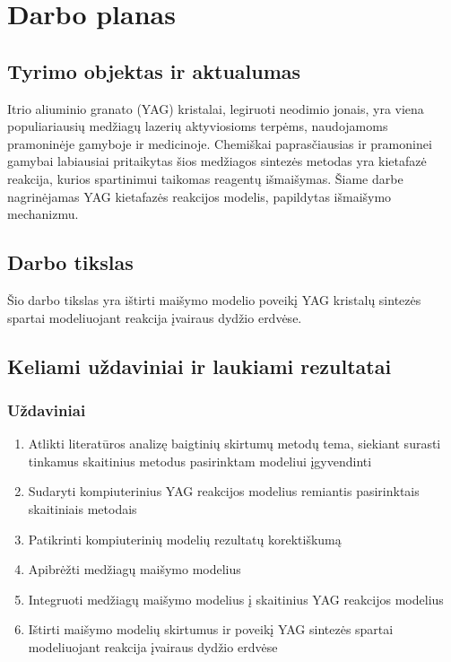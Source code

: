 \documentclass[]{VUMIFTemplateClass}
\begin{document}

\onehalfspacing


\section{Darbo planas}

\subsection{Tyrimo objektas ir aktualumas}

Itrio aliuminio granato (YAG) kristalai, legiruoti neodimio jonais, yra viena populiariausių medžiagų lazerių aktyviosioms terpėms, naudojamoms pramoninėje gamyboje ir medicinoje. Chemiškai paprasčiausias ir pramoninei gamybai labiausiai pritaikytas šios medžiagos sintezės metodas yra kietafazė reakcija, kurios spartinimui taikomas reagentų išmaišymas. Šiame darbe nagrinėjamas YAG kietafazės reakcijos modelis, papildytas išmaišymo mechanizmu.

\subsection{Darbo tikslas}

Šio darbo tikslas yra ištirti maišymo modelio poveikį YAG kristalų sintezės spartai modeliuojant reakcija įvairaus dydžio erdvėse.

\subsection{Keliami uždaviniai ir laukiami rezultatai}
\subsubsection{Uždaviniai}
\begin{enumerate}
    \item Atlikti literatūros analizę baigtinių skirtumų metodų tema, siekiant surasti tinkamus skaitinius metodus pasirinktam modeliui įgyvendinti
    \item Sudaryti kompiuterinius YAG reakcijos modelius remiantis pasirinktais skaitiniais metodais
    \item Patikrinti kompiuterinių modelių rezultatų korektiškumą
    \item Apibrėžti medžiagų maišymo modelius
    \item Integruoti medžiagų maišymo modelius į skaitinius YAG reakcijos modelius
    \item Ištirti maišymo modelių skirtumus ir poveikį YAG sintezės spartai modeliuojant reakcija įvairaus dydžio erdvėse
\end{enumerate}
\end{document}
